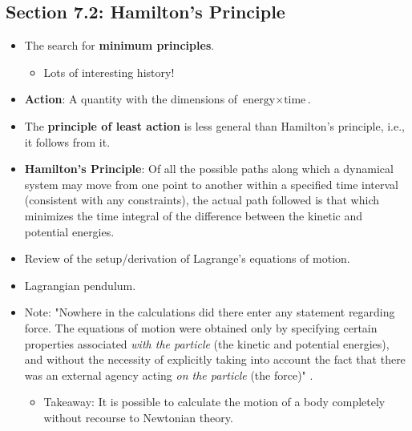 \documentclass[../notes.tex]{subfiles}
\begin{document}
\subsection*{Section 7.2: Hamilton's Principle}
\begin{itemize}
    \item The search for \textbf{minimum principles}.
    \begin{itemize}
        \item Lots of interesting history!
    \end{itemize}
    \item \textbf{Action}: A quantity with the dimensions of $\text{energy}\times\text{time}$.
    \item The \textbf{principle of least action} is less general than Hamilton's principle, i.e., it follows from it.
    \item \textbf{Hamilton's Principle}: Of all the possible paths along which a dynamical system may move from one point to another within a specified time interval (consistent with any constraints), the actual path followed is that which minimizes the time integral of the difference between the kinetic and potential energies.
    \item Review of the setup/derivation of Lagrange's equations of motion.
    \item Lagrangian pendulum.
    \item Note: "Nowhere in the calculations did there enter any statement regarding force. The equations of motion were obtained only by specifying certain properties associated \emph{with the particle} (the kinetic and potential energies), and without the necessity of explicitly taking into account the fact that there was an external agency acting \emph{on the particle} (the force)" \parencite[232-33]{bib:ThorntonMarion}.
    \begin{itemize}
        \item Takeaway: It is possible to calculate the motion of a body completely without recourse to Newtonian theory.
    \end{itemize}
\end{itemize}
\end{document}
